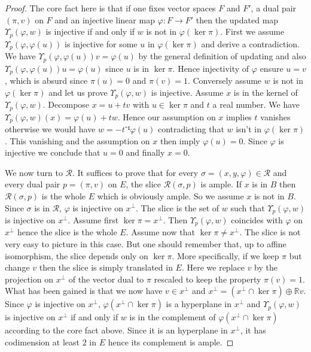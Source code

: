\documentclass[10pt,a4paper]{article}
\newcommand{\co}{\!:}
\newcommand{\Rel}{\mathcal{R}} %
\newcommand{\Upd}[3]{\Upsilon_{#1}\left(#2, #3\right)}
\newcommand{\leanok}{}
\begin{document}
\begin{proof}
  \leanok
  The core fact here is that if one fixes vector spaces $F$ and $F'$, a dual
  pair $(\pi, v)$ on $F$ and an injective linear map $\varphi \co F \to F'$
  then the updated map $\Upd{p}{\varphi}{w}$ is injective if and only if $w$
  is not in $\varphi(\ker\pi)$. First we assume $\Upd{p}{\varphi}{\varphi(u)}$
  is injective for some $u$ in $\varphi(\ker\pi)$ and derive a contradiction.
  We have $\Upd{p}{\varphi}{\varphi(u)}v = \varphi(u)$ by the general
  definition of updating and also $\Upd{p}{\varphi}{\varphi(u)}u = \varphi(u)$
  since $u$ is in $\ker \pi$. Hence injectivity of $\varphi$ ensure $u = v$,
  which is absurd since $\pi(u) = 0$ and $\pi(v) = 1$. Conversely assume $w$
  is not in $\varphi(\ker\pi)$ and let us prove $\Upd{p}{\varphi}{w}$ is
  injective. Assume $x$ is in the kernel of $\Upd{p}{\varphi}{w}$. Decompose
  $x = u + tv$ with $u \in \ker\pi$ and $t$ a real number. We have
  $\Upd{p}{\varphi}{w}(x) = \varphi(u) + tw$. Hence our assumption on $x$
  implies $t$ vanishes otherwise we would have $w = -t⁻¹\varphi(u)$
  contradicting that $w$ isn't in $\varphi(\ker\pi)$. This vanishing and the
  assumption on $x$ then imply $\varphi(u) = 0$. Since $\varphi$ is injective
  we conclude that $u = 0$ and finally $x = 0$.

  We now turn to $\Rel$. It suffices to prove that for every $\sigma = (x, y,
  \varphi) \in \Rel$ and every dual pair $p = (\pi, v)$ on $E$, the slice
  $\Rel(\sigma, p)$ is ample. If $x$ is in $B$ then $\Rel(\sigma, p)$ is the
  whole $E$ which is obviously ample. So we assume $x$ is not in $B$. Since
  $\sigma$ is in $\Rel$, $\varphi$ is injective on $x^\perp$. The slice is the
  set of $w$ such that $\Upd{p}{\varphi}{w}$ is injective on $x^\perp$. Assume
  first $\ker\pi = x^\perp$. Then $\Upd{p}{\varphi}{w}$ coincides with
  $\varphi$ on $x^\perp$ hence the slice is the whole $E$. Assume now that
  $\ker\pi \neq x^\perp$. The slice is not very easy to picture in this case.
  But one should remember that, up to affine isomorphism, the slice depends
  only on $\ker \pi$. More specifically, if we keep $\pi$ but change $v$ then
  the slice is simply translated in $E$. Here we replace $v$ by the projection
  on $x^\perp$ of the vector dual to $\pi$ rescaled to keep the property
  $\pi(v) = 1$. What has been gained is that we now have $v \in x^\perp$ and
  $x^\perp = (x^\perp \cap \ker \pi) \oplus ℝ v$. Since $\varphi$ is
  injective on $x^\perp$, $\varphi(x^\perp \cap \ker \pi)$ is a hyperplane
  in $x^\perp$ and $\Upd{p}{\varphi}{w}$ is injective on $x^\perp$ if and only
  if $w$ is in the complement of $\varphi(x^\perp \cap \ker \pi)$ according to
  the core fact above. Since it is an hyperplane in $x^\perp$, it has
  codimension at least $2$ in $E$ hence its complement is ample.
\end{proof}
\end{document}
